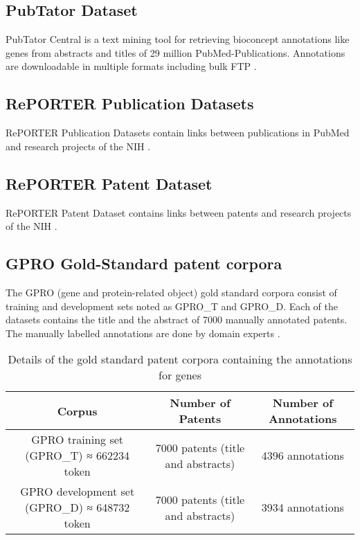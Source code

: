 \documentclass{article}
\begin{document}
\subsection{PubTator Dataset}
\label{pubtator}
PubTator Central is a text mining tool for retrieving bioconcept annotations like genes from abstracts and titles of 29 million PubMed-Publications. Annotations are downloadable in multiple formats including bulk FTP \cite{Wei2019PubTatorCA}.

\subsection{RePORTER Publication Datasets}
\label{publication}
RePORTER Publication Datasets contain links between publications in PubMed and research projects of the NIH \cite{publicNIH}.

\subsection{RePORTER Patent Dataset}
\label{patent}
RePORTER Patent Dataset contains links between patents and research projects of the NIH \cite{patentNIH}.

\subsection{GPRO Gold-Standard patent corpora}
\label{gpro}
The GPRO (gene and protein-related object) gold standard corpora consist of training and development sets noted as GPRO\_T and GPRO\_D. Each of the datasets contains the title and the abstract of 7000 manually annotated patents. The manually labelled annotations are done by domain experts \cite{Krallinger2015TheCC}.

\begin{table}[!ht]
\setlength\extrarowheight{2pt} %
\begin{footnotesize}
\begin{tabularx}{\textwidth}{|C|C|C|}
\hline
\textbf{Corpus} & \textbf{Number of Patents} & \textbf{Number of Annotations} \\
\hline
GPRO training set (GPRO\_T) ≈ 662234 token \cite{Krallinger2015TheCC} & 7000 patents (title and abstracts) & 4396 annotations \\
GPRO development set (GPRO\_D) ≈ 648732 token \cite{Krallinger2015TheCC} & 7000 patents (title and abstracts) & 3934 annotations \\
\hline
\end{tabularx}
\end{footnotesize}
\caption{Details of the gold standard patent corpora containing the annotations for genes \cite{Habibi2016PerformanceOG}}
\end{table}
\end{document}
